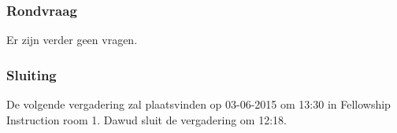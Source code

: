 \subsubsection{Rondvraag}
Er zijn verder geen vragen.

\subsubsection{Sluiting}
De volgende vergadering zal plaatsvinden op 03-06-2015 om 13:30 in Fellowship Instruction room 1.
\newline\newline
Dawud sluit de vergadering om 12:18.